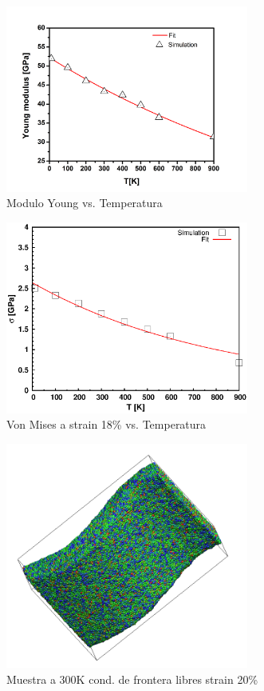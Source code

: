 \documentclass[10pt, oneside]{article} %
\begin{document}
\begin{figure}[H]
\centering
\includegraphics[width=8cm]{Figures/young_T_COMP.png}
\caption{Modulo Young vs. Temperatura}
\end{figure}

\begin{figure}[H]
\centering
\includegraphics[width=8cm]{Figures/18stress_T_COMP.eps}
\caption{Von Mises a strain 18\% vs. Temperatura}
\end{figure}

\begin{figure}[H]
\centering
\includegraphics[width=8cm]{Figures/300libresComp.png}
\caption{Muestra a 300K cond. de frontera libres strain 20\%}
\end{figure}
\end{document}

